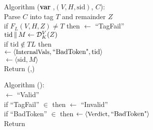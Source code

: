 \begin{figure}
{\medskip
Algorithm ({\bf var} ,$(V,H,\mathrm{sid})$, $C$):\\
\nudge Parse $C$ into tag $T$ and remainder $Z$\\ 
\nudge if $F_L(V,H,Z) \neq T$ then  $\gets$ ``TagFail''\\
\nudge $\mathrm{tid} \,\|\, M \gets \mathcal{D}_K^{V}(Z)$\\
\nudge if $\mathrm{tid}\not\in TL$ then\\
\nudge\nudge {} $\gets \langle
\textrm{\small InternalVals}, \mbox{``BadToken"}, \mathrm{tid} \rangle$\\
\nudge {} $\gets \langle \mathrm{sid}, M \rangle$\\
\nudge Return (,)

\medskip
Algorithm ():\\
\nudge {} $\gets$ ``Valid''\\
\nudge if ``TagFail'' $\in$  then  $\gets$ ``Invalid''\\
\nudge if ``BadToken'' $\in$  then  $\gets \langle
\textrm{\small Verdict},\mbox{``BadToken"} \rangle$\\
\nudge Return 

}
\end{figure}
